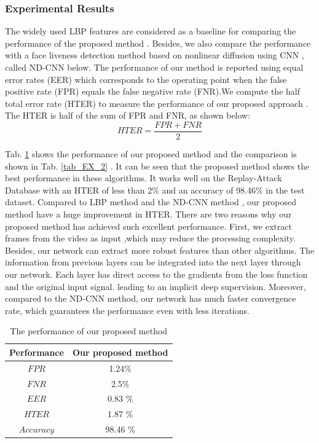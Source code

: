 \documentclass[journal]{IEEEtran}
\begin{document}
\subsubsection*{\textbf{Experimental Results}}
The widely used LBP features are considered as a baseline for comparing the performance of the proposed method \cite{chingovska2012effectiveness}. Besides, we also compare the performance with a face liveness detection method based on nonlinear diffusion using CNN \cite{alotaibi2017deep},  called ND-CNN below.  The performance of our method
is reported using equal error rates (EER) which corresponds to the operating point when the false positive rate (FPR) equals the false negative rate (FNR).We compute the half total error rate (HTER) to measure the performance of our proposed approach \cite{bengio2004statistical}. The HTER is half of the sum of FPR and FNR, as shown below:
\begin{equation}
\label{eq_Ex_1}
HTER = \frac{FPR+FNR}{2}
\end{equation}

 Tab. \ref{tab_EX_1} shows the performance of our proposed method and the comparison is shown in Tab. \ref{tab_EX_2} . It can be seen that the proposed method shows the best performance in these algorithms. It works well on the Replay-Attack Database with an HTER of less than 2$\%$ and an accuracy of 98.46$\%$ in the test dataset. Compared to LBP method and the ND-CNN method ,  our proposed method have a huge improvement in HTER. There are two reasons why our proposed method has achieved such excellent performance. First, we extract frames from the video as input ,which may reduce the processing complexity. Besides, our network can extract more robust features than other algorithms.  The information from previous layers can be integrated into the next layer through our network. Each layer has direct access to the gradients from the loss function and the original input signal. leading to an implicit deep supervision. Moreover, compared to the ND-CNN method, our network has much faster convergence rate, which guarantees the performance even with less iterations.
 
 \begin{table}[ht]
 	\renewcommand{\arraystretch}{1.3}
 	\normalsize
 	\centering
 	\caption{ The performance of our proposed method}
 	\label{tab_EX_1}
 	\begin{tabular}{|c|c|}
 		\hline
 		 Performance & Our proposed method\\
 		\hline \hline
 		$FPR$ & 1.24$\%$ \\
 		\hline
 		$FNR$ & 2.5$\%$ \\
 		\hline 
 		$EER$ & 0.83 $\%$  \\
 		\hline
 		$HTER$ & 1.87 $\%$ \\
 		\hline
 		$Accuracy$  & 98.46 $\%$ \\
 		\hline
 	\end{tabular}
 \end{table}
 
\end{document}
